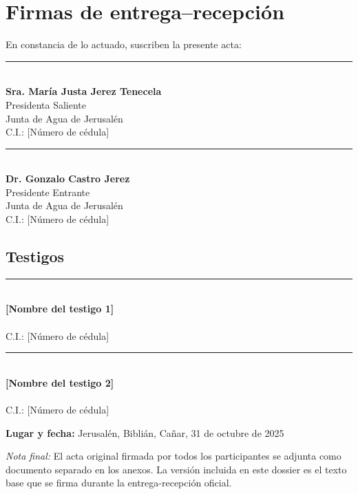 \section*{Firmas de entrega--recepción}

En constancia de lo actuado, suscriben la presente acta:

\vspace{1.5cm}

\noindent
\begin{minipage}[t]{0.45\textwidth}
\centering
\rule{6cm}{0.4pt} \\
\textbf{Sra. María Justa Jerez Tenecela} \\
Presidenta Saliente \\
Junta de Agua de Jerusalén \\
C.I.: [Número de cédula]
\end{minipage}
\hfill
\begin{minipage}[t]{0.45\textwidth}
\centering
\rule{6cm}{0.4pt} \\
\textbf{Dr. Gonzalo Castro Jerez} \\
Presidente Entrante \\
Junta de Agua de Jerusalén \\
C.I.: [Número de cédula]
\end{minipage}

\vspace{2cm}

\subsection*{Testigos}

\vspace{1.5cm}

\noindent
\begin{minipage}[t]{0.45\textwidth}
\centering
\rule{6cm}{0.4pt} \\
\textbf{[Nombre del testigo 1]} \\
[Cargo] \\
C.I.: [Número de cédula]
\end{minipage}
\hfill
\begin{minipage}[t]{0.45\textwidth}
\centering
\rule{6cm}{0.4pt} \\
\textbf{[Nombre del testigo 2]} \\
[Cargo] \\
C.I.: [Número de cédula]
\end{minipage}

\vspace{2cm}

\noindent
\textbf{Lugar y fecha:} Jerusalén, Biblián, Cañar, 31 de octubre de 2025

\vspace{1cm}

\textit{Nota final:} El acta original firmada por todos los participantes se adjunta como documento separado en los anexos. La versión incluida en este dossier es el texto base que se firma durante la entrega-recepción oficial.
